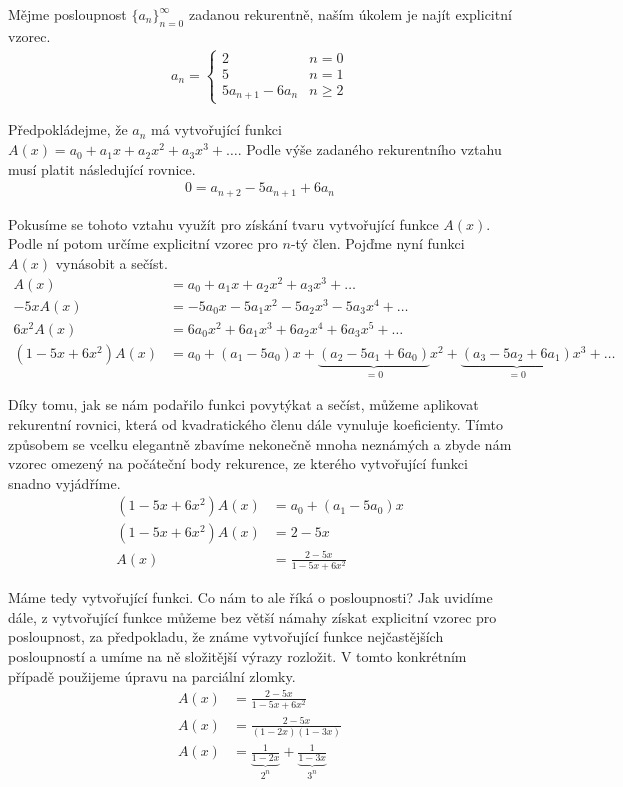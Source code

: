 \begin{t_example}$ $\\
  Mějme posloupnost $\{a_n\}_{n=0}^\infty$ zadanou rekurentně, naším úkolem je najít explicitní vzorec.
  \begin{align*}
    a_n =
    \begin{cases}
      2 & n = 0 \\
      5 & n = 1 \\
      5a_{n+1}-6a_n & n\geq 2
    \end{cases}
  \end{align*}
  
  Předpokládejme, že $a_n$ má vytvořující funkci $A(x)=a_0+a_1x+a_2x^2+a_3x^3+\dots$. Podle výše zadaného rekurentního vztahu musí platit následující rovnice.
  \begin{align*}
    0=a_{n+2}-5a_{n+1}+6a_n
  \end{align*}
  
  Pokusíme se tohoto vztahu využít pro získání tvaru vytvořující funkce $A(x)$. Podle ní potom určíme explicitní vzorec pro $n$-tý člen. Pojďme nyní funkci $A(x)$ vynásobit a sečíst.
  \begin{align*}
    A(x) &= a_0+a_1x+a_2x^2+a_3x^3+\dots\\
    -5xA(x) &= -5a_0x-5a_1x^2-5a_2x^3-5a_3x^4+\dots\\
    6x^2A(x) &= 6a_0x^2+6a_1x^3+6a_2x^4+6a_3x^5+\dots\\
    (1-5x+6x^2)A(x) &= a_0+(a_1-5a_0)x+\underbrace{(a_2-5a_1+6a_0)}_{=0}x^2+\underbrace{(a_3-5a_2+6a_1)}_{=0}x^3+\dots
  \end{align*}
  
  Díky tomu, jak se nám podařilo funkci povytýkat a sečíst, můžeme aplikovat rekurentní rovnici, která od kvadratického členu dále vynuluje koeficienty. Tímto způsobem se vcelku elegantně zbavíme nekonečně mnoha neznámých a zbyde nám vzorec omezený na počáteční body rekurence, ze kterého vytvořující funkci snadno vyjádříme.
  \begin{align*}
    (1-5x+6x^2)A(x) &= a_0+(a_1-5a_0)x\\
    (1-5x+6x^2)A(x) &= 2-5x\\
    A(x) &= \frac{2-5x}{1-5x+6x^2}
  \end{align*}
  
  Máme tedy vytvořující funkci. Co nám to ale říká o posloupnosti? Jak uvidíme dále, z vytvořující funkce můžeme bez větší námahy získat explicitní vzorec pro posloupnost, za předpokladu, že známe vytvořující funkce nejčastějších posloupností a umíme na ně složitější výrazy rozložit. V tomto konkrétním případě použijeme úpravu na parciální zlomky.
  \begin{align*}
    A(x) &= \frac{2-5x}{1-5x+6x^2}\\
    A(x) &= \frac{2-5x}{(1-2x)(1-3x)}\\
    A(x) &= \underbrace{\frac{1}{1-2x}}_{2^n}+\underbrace{\frac{1}{1-3x}}_{3^n}
  \end{align*}
  

\end{t_example}
